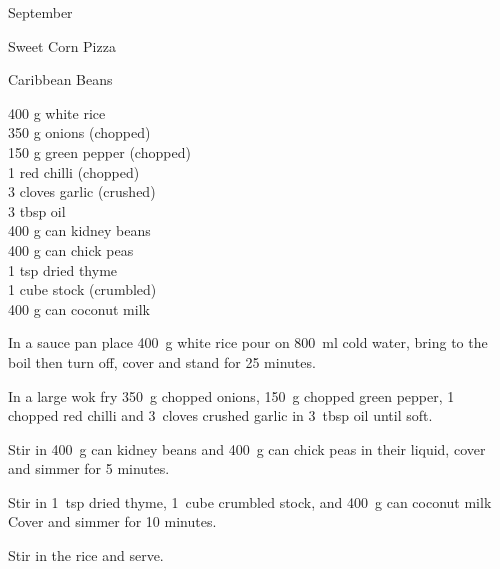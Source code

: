 \begin{menu}{September}
\begin{recipe}{2}{Sweet Corn Pizza}
\begin{instructions}
    \end{instructions}
    \end{recipe}%
  
    \begin{recipe}{2}{Caribbean Beans}%
		\begin{ingredients}
		400 g white rice  \\
	350 g onions (chopped) \\
	150 g green pepper (chopped) \\
	1  red chilli (chopped) \\
	3 cloves garlic (crushed) \\
	3 tbsp oil  \\
	400 g can kidney beans  \\
	400 g can chick peas  \\
	1 tsp dried thyme  \\
	1 cube stock (crumbled) \\
	400 g can coconut milk  \\
	
		\end{ingredients}
	
	
    \begin{instructions}
    \item 
      In a
      sauce pan
      place
      400~g  white rice
      pour on
      800~ml  cold water,
      bring to the boil then turn off, cover and stand for 25 minutes.
    \item 
        In a large wok fry
        350~g chopped onions,
        150~g chopped green pepper,
        1~ chopped red chilli
        and
        3~cloves crushed garlic
        in
        3~tbsp  oil
        until soft.
      \item 
        Stir in
        400~g  can kidney beans
        and
        400~g  can chick peas
        in their liquid,
        cover and simmer for 5 minutes.
      \item 
        Stir in
        1~tsp  dried thyme,
        1~cube crumbled stock,
        and
        400~g  can coconut milk
        Cover and simmer for 10 minutes.
      \item 
        Stir in the rice and serve.
      
    \end{instructions}
    \end{recipe}%
  

\end{menu}
